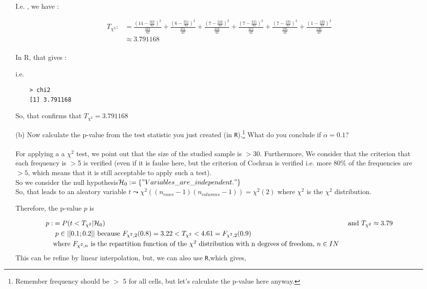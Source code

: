 \documentclass[12pt,letterpaper]{article}
\begin{document}
\begin{enumerate}
	I.e. , we have : 	

	\begin{align*}
		T_{\chi^2}: &= \frac{(14 - \frac{567}{42})^2}{\frac{567}{42}} + \frac{(6 -\frac{351}{42})^2}{\frac{351}{42}} + \frac{(7 - \frac{216}{42})^2}{\frac{216}{42}} +  \frac{(7 - \frac{315}{42})^2}{\frac{315}{42}}  + \frac{(7 - \frac{195}{42})^2}{\frac{195}{42}}  +  \frac{(1 - \frac{120}{42})^2}{\frac{120}{42}} \\
		&\approx 3.791168\\
	\end{align*}

	In R, that gives :
	  
	\newpage
	i.e. 
	\begin{verbatim}
	> chi2
	[1] 3.791168
	\end{verbatim}
	 So, that confirms that $T_{\chi^2}=3.791168$


	\item [(b)]
	Now calculate the p-value from the test statistic you just created (in \texttt{R}).\footnote{Remember frequency should be $>$ 5 for all cells, but let's calculate the p-value here anyway.}  What do you conclude if $\alpha = 0.1$?\\
	\\
	For applying a a $\chi^2$ test, we point out that the size of the studied sample is $>30$. Furthermore, We consider that the criterion that each frequency is $>$5 is verified (even if it is faulse here, but the criterion of Cochran is verified i.e. more 80\% of the frequencies are $>5$, which means that it is still acceptable to apply such a test). \\
	
	So we consider the null hypothesis$ \mathcal{H}_0:=\{"Variables\_ are\_independent."\}$	\\

	So, that leads to an aleatory variable $t \leadsto \chi^2((n_{raws}-1)(n_{columns}-1)) = \chi^2(2)$ where $\chi^2$ is the $ \chi^2$ distribution. 
	
	Therefore,  the p-value $p$ is

	\begin{align*}
		p:&=P(t<T_{\chi^2}|\mathcal{H}_0) &\mbox{and $T_{\chi^2}\approx 3.79$} \\
		 &\mbox{ $p\in |[0.1;0.2]|$ because $ F_{\chi^2,2}(0.8)=3.22< T_{\chi^2}< 4.61= F_{\chi^2,2}(0.9)$ }\\
		&\mbox{where $F_{\chi^2,n}$ is the repartition function of the $\chi^2$ distribution with n degrees of freedom, $n\in IN$ }
	\end{align*}	
	This can be refine by linear interpolation, but, we can also use \texttt{R},which gives,
	  
	

\end{enumerate}
\end{document}
